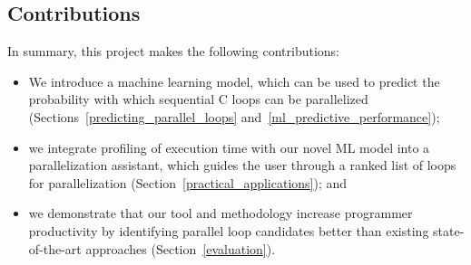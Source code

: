 \subsection{Contributions}
\quad In summary, this project makes the following contributions:
%
\begin{itemize}
\renewcommand\labelitemi{$\vartriangleright$}
\renewcommand\labelitemii{$\bullet$}
\item We introduce a machine learning model, which can be used to predict the probability with which sequential C loops can be parallelized (Sections~\ref{predicting_parallel_loops} and~\ref{ml_predictive_performance});
\item we integrate profiling of execution time with our novel ML model into a parallelization assistant, which guides the user through a ranked list of loops for parallelization (Section~\ref{practical_applications}); and
\item we demonstrate that our tool and methodology increase programmer productivity by identifying parallel loop candidates better than existing state-of-the-art approaches (Section~\ref{evaluation}).

\end{itemize}
